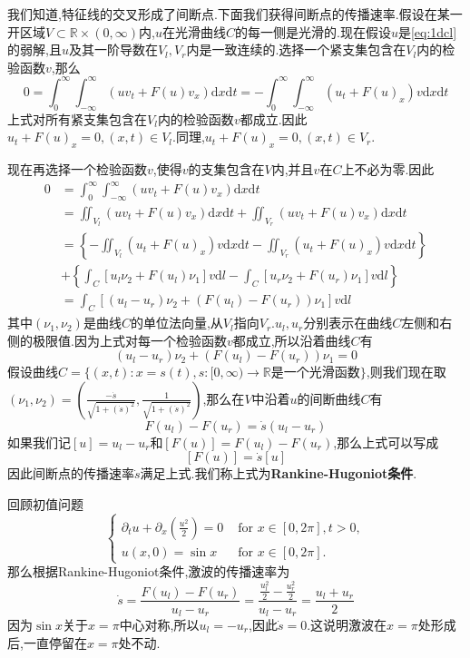 \qquad 我们知道,特征线的交叉形成了间断点.下面我们获得间断点的传播速率.假设在某一开区域$V\subset \mathbb{R}\times (0,\infty)$内,$u$在光滑曲线$C$的每一侧是光滑的.现在假设$u$是\eqref{eq:1dcl}的弱解,且$u$及其一阶导数在$V_l,V_r$内是一致连续的.选择一个紧支集包含在$V_l$内的检验函数$v$,那么
$$
0=\int_0^\infty\int_{-\infty}^\infty (u v_t+F(u)v_x)\mathrm{d}x\mathrm{d}t=-\int_0^\infty\int_{-\infty}^\infty (u_t+F(u)_x)v\mathrm{d}x\mathrm{d}t
$$
上式对所有紧支集包含在$V_l$内的检验函数$v$都成立.因此$u_t+F(u)_x=0,(x,t)\in V_l$.同理,$u_t+F(u)_x=0,(x,t)\in V_r$.\par
现在再选择一个检验函数$v$,使得$v$的支集包含在$V$内,并且$v$在$C$上不必为零.因此
$$
\begin{aligned}
    0 &=\int_0^\infty\int_{-\infty}^\infty (u v_t+F(u)v_x)\mathrm{d}x\mathrm{d}t\\
    &=\iint_{V_l} (u v_t+F(u)v_x)\mathrm{d}x\mathrm{d}t+\iint_{V_r} (u v_t+F(u)v_x)\mathrm{d}x\mathrm{d}t\\
    &=\left\{-\iint_{V_l} (u_t+F(u)_x)v\mathrm{d}x\mathrm{d}t - \iint_{V_r} (u_t+F(u)_x)v\mathrm{d}x\mathrm{d}t\right\}\\
    &+\left\{\int_{C}[u_l\nu_2+F(u_l)\nu_1]v\mathrm{d}l-\int_{C}[u_r\nu_2+F(u_r)\nu_1]v\mathrm{d}l\right\}\\
    &= \int_{C} \left[(u_l-u_r)\nu_2+(F(u_l)-F(u_r))\nu_1\right]v\mathrm{d}l
\end{aligned}
$$
其中$(\nu_1,\nu_2)$是曲线$C$的单位法向量,从$V_l$指向$V_r$.$u_l,u_r$分别表示在曲线$C$左侧和右侧的极限值.因为上式对每一个检验函数$v$都成立,所以沿着曲线$C$有
$$
(u_l-u_r)\nu_2+(F(u_l)-F(u_r))\nu_1=0
$$
\qquad 假设曲线$C=\{(x,t):x=s(t),s:[0,\infty)\to\mathbb{R}\text{是一个光滑函数}\}$,则我们现在取$(\nu_1,\nu_2)=(\frac{-\dot{s}}{\sqrt{1+(\dot{s})^2}}, \frac{1}{\sqrt{1+(\dot{s})^2}})$,那么在$V$中沿着$u$的间断曲线$C$有
$$
F(u_l)-F(u_r)=\dot{s}(u_l-u_r)
$$
如果我们记$[u]=u_l-u_r$和$[F(u)]=F(u_l)-F(u_r)$,那么上式可以写成
$$
[F(u)]=\dot{s}[u]
$$
因此间断点的传播速率$\dot{s}$满足上式.我们称上式为\textbf{Rankine-Hugoniot条件}.\par
回顾初值问题
$$
\left\{  \begin{array}{ll} {\partial }_{t}u + {\partial }_{x}\left( \frac{{u}^{2}}{2}\right)  = 0 & \text{ for }x \in  \left\lbrack  {0,{2\pi }}\right\rbrack  ,t > 0, \\  u\left( {x,0}\right)  = \sin x & \text{ for }x \in  \left\lbrack  {0,{2\pi }}\right\rbrack  . \end{array}\right.
$$
那么根据Rankine-Hugoniot条件,激波的传播速率为
$$
\dot{s}=\frac{F(u_l)-F(u_r)}{u_l-u_r}=\frac{\frac{u_l^2}{2}-\frac{u_r^2}{2}}{u_l-u_r}=\frac{u_l+u_r}{2}
$$
因为$\sin x$关于$x=\pi$中心对称,所以$u_l=-u_r$,因此$\dot{s}=0$.这说明激波在$x=\pi$处形成后,一直停留在$x=\pi$处不动.\par
